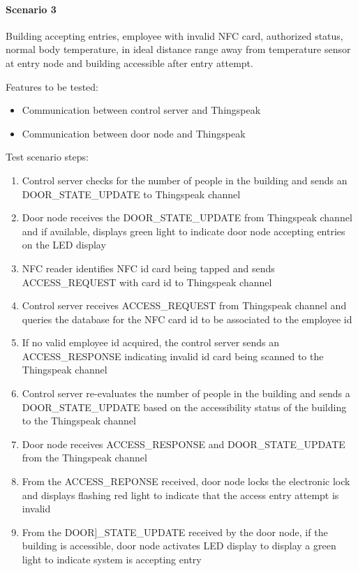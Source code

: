 \paragraph{Scenario 3}
Building accepting entries, employee with invalid NFC card, authorized status,
normal body temperature, in ideal distance range away from temperature sensor at
entry node and building accessible after entry attempt.

\noindent
Features to be tested:
\begin{itemize}
    \item Communication between control server and Thingspeak
    \item Communication between door node and Thingspeak
\end{itemize}

\noindent
Test scenario steps:
\begin{enumerate}
    \item Control server checks for the number of people in the building and
          sends an DOOR\_STATE\_UPDATE to Thingspeak channel
    \item Door node receives the DOOR\_STATE\_UPDATE from Thingspeak channel and
         if available, displays green light to indicate door node accepting
         entries on the LED display
    \item NFC reader identifies NFC id card being tapped and sends
          ACCESS\_REQUEST with card id to Thingspeak channel
    \item Control server receives ACCESS\_REQUEST from Thingspeak channel and
          queries the database for the NFC card id to be associated to the
          employee id
    \item If no valid employee id acquired, the control server sends an
          ACCESS\_RESPONSE indicating invalid id card being scanned to the
          Thingspeak channel
    \item Control server re-evaluates the number of people in the building and
          sends a DOOR\_STATE\_UPDATE based on the accessibility status of the
          building to the Thingspeak channel
    \item Door node receives ACCESS\_RESPONSE and DOOR\_STATE\_UPDATE from the
          Thingspeak channel 
    \item From the ACCESS\_REPONSE received, door node locks the electronic
          lock and displays flashing red light to indicate that the access entry
          attempt is invalid
    \item From the DOOR]\_STATE\_UPDATE received by the door node, if the
          building is accessible, door node activates LED display to display a
          green light to indicate system is accepting entry
\end{enumerate}

